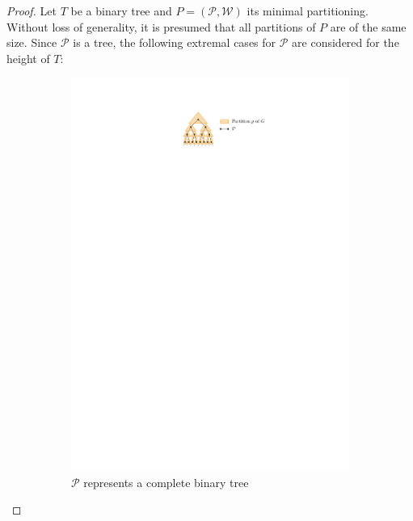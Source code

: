\begin{proof}
	Let $T$ be a binary tree and $P=(\mathcal{P},\mathcal{W})$ its minimal partitioning. Without loss of generality, it is presumed that all partitions of $P$ are of the same size. Since $\mathcal{P}$ is a tree, the following extremal cases for $\mathcal{P}$ are considered for the height of $T$:
	\begin{figure}[H]
		\centering
		\begin{subfigure}{0.6\textwidth}
			\centering
			\includegraphics[page=1,width=\linewidth]{graphics/Partitioning_scheme.pdf}
			\caption{$\mathcal{P}$ represents a complete binary tree}\label{im:partitioning_binary}
		\end{subfigure}
		\begin{subfigure}{0.6\textwidth}
			\centering

\end{subfigure}
\end{figure}
\end{proof}
